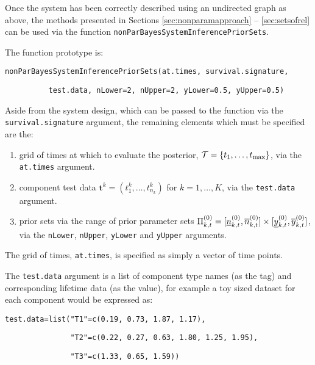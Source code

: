 \documentclass[12pt, a4paper]{elsarticle}
\newcommand{\bs}[1]{\boldsymbol{#1}}
\renewcommand{\vec}[1]{{\bs#1}}
\def\tmax{t_\text{max}}
\begin{document}
Once the system has been correctly described using an undirected graph
as above, the methods presented in Sections \ref{sec:nonparamapproach}
-- \ref{sec:setsofrel} can be used via the function
\texttt{nonParBayesSystemInferencePriorSets}.

The function prototype is:

\noindent\texttt{nonParBayesSystemInferencePriorSets(at.times, survival.signature,}

\noindent\texttt{~~~~~~~~~~test.data, nLower=2, nUpper=2, yLower=0.5, yUpper=0.5)}

Aside from the system design, which can be passed to the function via
the \texttt{survival.signature} argument, the remaining elements which
must be specified are the:
\begin{enumerate}
  \item grid of times at which to evaluate the posterior, ${\cal T} = \{t_1, \ldots, \tmax\}$, via the \texttt{at.times} argument.
  \item component test data $\vec{t}^k = (t^k_1, \ldots, t^k_{n_k})$ for $k=1,\dots,K$, via the \texttt{test.data} argument.
  \item prior sets via the range of prior parameter sets $\Pi^{(0)}_{k,t} = [\underline{n}^{(0)}_{k,t}, \overline{n}^{(0)}_{k,t}] \times [\underline{y}^{(0)}_{k,t}, \overline{y}^{(0)}_{k,t}]$, via the \texttt{nLower}, \texttt{nUpper}, \texttt{yLower} and \texttt{yUpper} arguments.
\end{enumerate}

The grid of times, \texttt{at.times}, is specified as simply a vector 
of time points.

The \texttt{test.data} argument is a list of component type names (as
the tag) and corresponding lifetime data (as the value), for example 
a toy sized dataset for each component would be expressed as:

\noindent\texttt{test.data=list("T1"=c(0.19, 0.73, 1.87, 1.17),}

\noindent\texttt{~~~~~~~~~~~~~~~"T2"=c(0.22, 0.27, 0.63, 1.80, 1.25, 1.95),}

\noindent\texttt{~~~~~~~~~~~~~~~"T3"=c(1.33, 0.65, 1.59))}
\end{document}
